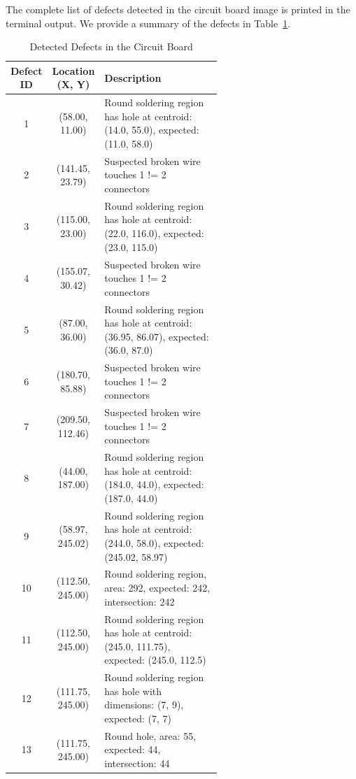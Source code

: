 \documentclass[a4paper,12pt]{article}
\begin{document}
The complete list of defects detected in the circuit board image is printed in the terminal output. We provide a summary of the defects in Table~\ref{tab:defects}.

\begin{table}[!htbp]
    \centering
    \caption{Detected Defects in the Circuit Board}
    \label{tab:defects}
    \begin{tabular}{|c|c|p{0.6\linewidth}|}
        \hline
        \textbf{Defect ID} & \textbf{Location (X, Y)} & \textbf{Description} \\
        \hline
        1 & (58.00, 11.00) & Round soldering region has hole at centroid: (14.0, 55.0), expected: (11.0, 58.0) \\
        2 & (141.45, 23.79) & Suspected broken wire touches 1 != 2 connectors \\
        3 & (115.00, 23.00) & Round soldering region has hole at centroid: (22.0, 116.0), expected: (23.0, 115.0) \\
        4 & (155.07, 30.42) & Suspected broken wire touches 1 != 2 connectors \\
        5 & (87.00, 36.00) & Round soldering region has hole at centroid: (36.95, 86.07), expected: (36.0, 87.0) \\
        6 & (180.70, 85.88) & Suspected broken wire touches 1 != 2 connectors \\
        7 & (209.50, 112.46) & Suspected broken wire touches 1 != 2 connectors \\
        8 & (44.00, 187.00) & Round soldering region has hole at centroid: (184.0, 44.0), expected: (187.0, 44.0) \\
        9 & (58.97, 245.02) & Round soldering region has hole at centroid: (244.0, 58.0), expected: (245.02, 58.97) \\
        10 & (112.50, 245.00) & Round soldering region, area: 292, expected: 242, intersection: 242 \\
        11 & (112.50, 245.00) & Round soldering region has hole at centroid: (245.0, 111.75), expected: (245.0, 112.5) \\
        12 & (111.75, 245.00) & Round soldering region has hole with dimensions: (7, 9), expected: (7, 7) \\
        13 & (111.75, 245.00) & Round hole, area: 55, expected: 44, intersection: 44 \\
        \hline
    \end{tabular}
\end{table}
\end{document}
